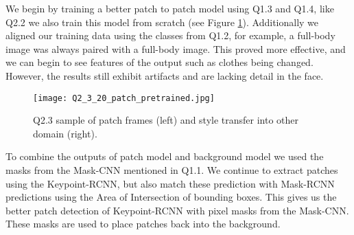  We begin by training a better patch to patch model using Q1.3 and Q1.4, like Q2.2 we also train this model from scratch (see Figure \ref{fig:Q2_4}).
 Additionally we aligned our training data using the classes from Q1.2, for example, a full-body image was always paired with a full-body image.
 This proved more effective, and we can begin to see features of the output such as clothes being changed.
 However, the results still exhibit artifacts and are lacking detail in the face. 
 
 \begin{figure}[h!]
  \begin{center}
  \texttt{[image: Q2\_3\_20\_patch\_pretrained.jpg]}
    \caption{Q2.3 sample of patch frames (left) and style transfer into other domain (right).}
    \label{fig:Q2_4}
  \end{center}
  \end{figure}
 
 To combine the outputs of patch model and background model we used the masks from the Mask-CNN mentioned in Q1.1.
 We continue to extract patches using the Keypoint-RCNN, but also match these prediction with Mask-RCNN predictions using the Area of Intersection of bounding boxes.
 This gives us the better patch detection of Keypoint-RCNN with pixel masks from the Mask-CNN.
 These masks are used to place patches back into the background.
 